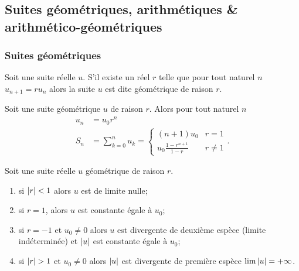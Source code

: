 \subsection{Suites géométriques, arithmétiques \& arithmético-géo\-métriques}

\subsubsection{Suites géométriques}

\begin{defdef}
  Soit une suite réelle \(u\). S'il existe un réel \(r\) telle que pour tout naturel \(n\) \(u_{n+1}=r u_n\) alors la suite \(u\) est dite géométrique de raison \(r\).
\end{defdef}
\begin{prop}
  Soit une suite géométrique \(u\) de raison \(r\). Alors pour tout naturel \(n\)
  \begin{align}
      u_n &= u_0 r^n \\ 
      S_n &=\sum_{k=0}^n u_k = \begin{cases} (n+1) u_0 & r=1 \\ u_0 \frac{1-r^{n+1}}{1-r} & r \neq 1 \end{cases}.
  \end{align}
\end{prop}
\begin{prop}
  Soit une suite réelle \(u\) géométrique de raison \(r\).
  \begin{enumerate}
  \item si \(\left\lvert r\right\rvert < 1\) alors \(u\) est de limite nulle;
  \item si \(r=1\), alors \(u\) est constante égale à \(u_0\);
  \item si \(r=-1\) et \(u_0 \neq 0\) alors \(u\) est divergente de deuxième espèce (limite indéterminée) et \(\left\lvert u\right\rvert\) est constante égale à \(u_0\);
  \item si \(\left\lvert r\right\rvert>1\) et \(u_0 \neq 0\) alors \(\left\lvert u\right\rvert\) est divergente de première espèce \(\lim \left\lvert u\right\rvert = +\infty\).
  \end{enumerate}
\end{prop}

